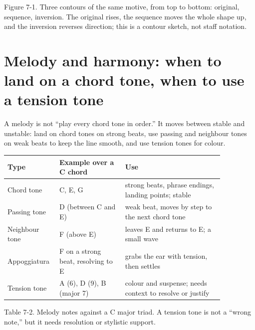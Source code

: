 \begin{center}
\begin{minipage}{0.86\linewidth}
\centering
{}

Figure 7-1. Three contours of the same motive, from top to bottom: original, sequence, inversion. The original rises, the sequence moves the whole shape up, and the inversion reverses direction; this is a contour sketch, not staff notation.
\end{minipage}
\end{center}

\section{Melody and harmony: when to land on a chord tone, when to use a tension tone}

A melody is not ``play every chord tone in order.'' It moves between stable and unstable: land on chord tones on strong beats, use passing and neighbour tones on weak beats to keep the line smooth, and use tension tones for colour.

\begin{center}
\begin{minipage}{\linewidth}
\centering
\small
\begin{tabular}{p{0.16\linewidth}p{0.28\linewidth}p{0.42\linewidth}}
\toprule
Type & Example over a C chord & Use \\
\midrule
Chord tone & C, E, G & strong beats, phrase endings, landing points; stable \\
Passing tone & D (between C and E) & weak beat, moves by step to the next chord tone \\
Neighbour tone & F (above E) & leaves E and returns to E; a small wave \\
Appoggiatura & F on a strong beat, resolving to E & grabs the ear with tension, then settles \\
Tension tone & A (6), D (9), B (major 7) & colour and suspense; needs context to resolve or justify \\
\bottomrule
\end{tabular}

Table 7-2. Melody notes against a C major triad. A tension tone is not a ``wrong note,'' but it needs resolution or stylistic support.
\end{minipage}
\end{center}

